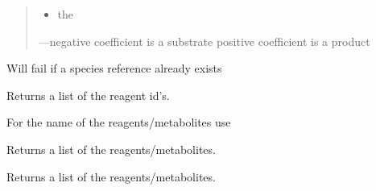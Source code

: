 \documentclass[letterpaper,12pt,english]{sphinxmanual}
\begin{document}
\begin{fulllineitems}
\begin{fulllineitems}
\begin{quote}
\begin{itemize}
\item {} 
\sphinxAtStartPar
{} the

\end{itemize}

\begin{flushright}
---negative coefficient is a substrate
\textendash{} positive coefficient is a product
\end{flushright}
\end{quote}

\sphinxAtStartPar
Will fail if a species reference already exists

\end{fulllineitems}


\begin{fulllineitems}
\label{\detokenize{api/core:cbmpy.CBModel.Reaction.getReagentObjIds}}
\pysigstartsignatures
\pysiglinewithargsret
{}
{}
{}
\pysigstopsignatures
\sphinxAtStartPar
Returns a list of the reagent id’s.

\sphinxAtStartPar
For the name of the reagents/metabolites use 

\end{fulllineitems}


\begin{fulllineitems}
\label{\detokenize{api/core:cbmpy.CBModel.Reaction.getReagentRefs}}
\pysigstartsignatures
\pysiglinewithargsret
{}
{}
{}
\pysigstopsignatures
\sphinxAtStartPar
Returns a list of the reagents/metabolites.

\end{fulllineitems}


\begin{fulllineitems}
\label{\detokenize{api/core:cbmpy.CBModel.Reaction.getSpeciesIds}}
\pysigstartsignatures
\pysiglinewithargsret
{}
{}
{}
\pysigstopsignatures
\sphinxAtStartPar
Returns a list of the reagents/metabolites.


\end{fulllineitems}
\end{fulllineitems}
\end{document}

